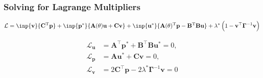 \documentclass[
  pdf,
  10pt,
  xcolor={svgnames},
]{beamer}
\newcommand{\mbf}[1]{\mathbf{#1}}
\newcommand{\mc}[1]{\mathcal{#1}}
\newcommand{\T}{\mathrm{T}}
\newcommand{\mat}[1]{\mathbf{{#1}}}
\begin{document}
\begin{frame}
  \frametitle{Solving for Lagrange Multipliers}
  \begin{block}{}
    \begin{equation*}
      \mc{L}
      = \inp{\mbf{v}}{\mat{C}^\T \mbf{p}}
      + \inp{\mbf{p}^*}{\mat{A}(\theta)\mbf{u} + \mat{C} \mbf{v}}
      + \inp{\mbf{u}^*}{
        \mat{A}(\theta)^\T \mbf{p} - \mat{B}^\T \mat{B} \mbf{u}
      }
      + \lambda^* \left( 1-\mbf{v}^\top \mat{\Gamma}^{-1} \mbf{v} \right)
    \end{equation*}
  \end{block}
  \begin{align*}
    \mc{L}_\mbf{u}
     & = \mat{A}^\top \mbf{p}^* + \mat{B}^\top\mat{B} \mbf{u}^* = 0,      \\
    \mc{L}_\mbf{p}
     & = \mat{A} \mbf{u}^* + \mat{C} \mbf{v} = 0,                         \\
    \mc{L}_\mbf{v}
     & = 2\mat{C}^\top \mbf{p} - 2\lambda^* \mat{\Gamma}^{-1} \mbf{v} = 0
  \end{align*}
\end{frame}
\end{document}
